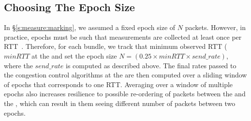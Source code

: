 


\subsection{Choosing The Epoch Size}
\label{s:measure:epoch}
%

In \S\ref{s:measure:marking}, we assumed a fixed epoch size of $N$ packets. However, in practice, epochs must be such that measurements are collected at least once per RTT~\cite{ccp}. Therefore, for each bundle, we track that minimum observed RTT ($minRTT$ at the \inbox and set the epoch size $N = (0.25 \times minRTT \times send\_rate)$, where the $send\_rate$ is computed as described above. The final rates passed to the congestion control algorithms at the \inbox are then computed over a sliding window of epochs that corresponds to one RTT. Averaging over a window of multiple epochs also increases resilience to possible re-ordering of packets between the \inbox and the \outbox, which can result in them seeing different number of packets between two epochs.


